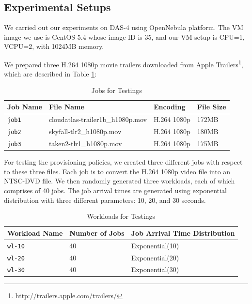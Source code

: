 \subsection{Experimental Setups}
We carried out our experiments on DAS-4 using OpenNebula platform. The VM image we use is CentOS-5.4 whose image ID is 35, and our VM setup is CPU=1, VCPU=2, with 1024MB memory.

We prepared three H.264 1080p movie trailers downloaded from Apple Trailers\footnote{http://trailers.apple.com/trailers/}, which are described in Table \ref{table_joblist}:

\begin{table}[!t]
\caption{Jobs for Testings}
\label{table_joblist}
\centering
\begin{tabular}{|l|l|l|l|}
\hline
Job Name & File Name & Encoding & File Size\\
\hline
\texttt{job1} & cloudatlas-trailer1b\_h1080p.mov & H.264 1080p & 172MB \\
\hline
\texttt{job2} & skyfall-tlr2\_h1080p.mov & H.264 1080p & 180MB \\
\hline
\texttt{job3} & taken2-tlr1\_h1080p.mov & H.264 1080p & 175MB \\
\hline
\end{tabular}
\end{table}

For testing the provisioning policies, we created three different jobs with respect to these three files. Each job is to convert the H.264 1080p video file into an NTSC-DVD file. We then randomly generated three workloads, each of which comprises of 40 jobs. The job arrival times are generated using exponential distribution with three different parameters: 10, 20, and 30 seconds.

\begin{table}[!t]
\caption{Workloads for Testings}
\label{table_workloadlist}
\centering
\begin{tabular}{|l|l|l|}
\hline
Workload Name & Number of Jobs & Job Arrival Time Distribution \\
\hline
\texttt{wl-10} & 40 & Exponential(10) \\
\hline
\texttt{wl-20} & 40 & Exponential(20) \\
\hline
\texttt{wl-30} & 40 & Exponential(30) \\
\hline
\end{tabular}
\end{table}


